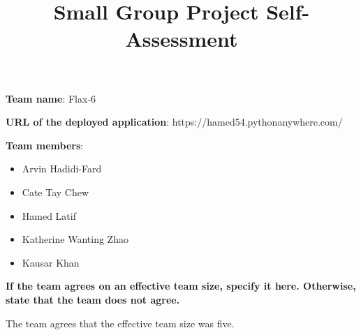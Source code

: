 \documentclass[10pt,a4paper]{article}
\begin{document}
\title{Small Group Project Self-Assessment}
\author{}
\date{}
\maketitle


\noindent\textbf{Team name}: Flax-6

\noindent\textbf{URL of the deployed application}: https://hamed54.pythonanywhere.com/

\noindent\textbf{Team members}:
\begin{itemize}
\setlength\itemsep{0em}
\item Arvin Hadidi-Fard
\item Cate Tay Chew
\item Hamed Latif
\item Katherine Wanting Zhao
\item Kausar Khan
\end{itemize}

\noindent\textbf{If the team agrees on an effective team size, specify it here.  Otherwise, state that the team does not agree.}

\vspace{2mm}

\hspace{-7mm} The team agrees that the effective team size was five.


\end{document}
